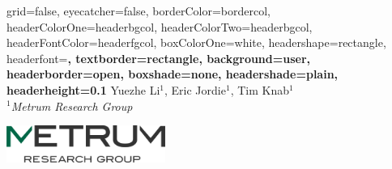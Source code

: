 \documentclass[a0paper,portrait]{baposter}
\begin{document}

\background{
}

\begin{poster}{
	grid=false,
	eyecatcher=false, 
	borderColor=bordercol,
	headerColorOne=headerbgcol,
	headerColorTwo=headerbgcol,
	headerFontColor=headerfgcol,
	boxColorOne=white,
	headershape=rectangle,
	headerfont=\Large\bf\textsf,
	textborder=rectangle,
	background=user,
	headerborder=open,
  boxshade=none, 
  headershade=plain,
  headerheight=0.1\textheight %
}
{
}
{
	\textbf{\textsf{\color{titlefgcol}{
	  A multi-organ integrated QSP model for hematopoietic stem cell differentiation to predict the immune cell reconstitution in ex-vivo gene therapy
	 }}}\vspace{.5em}
}
{
	Yuezhe Li$^1$, Eric Jordie$^1$, Tim Knab$^1$\\
	{\smaller
	  $^1$\textit{Metrum Research Group}
	}
}
{
		\begin{minipage}{16em}
			\begin{center}
			\includegraphics[width=14em]{newlogo} 
			\end{center}
		\end{minipage}
}



\end{poster}
\end{document}
